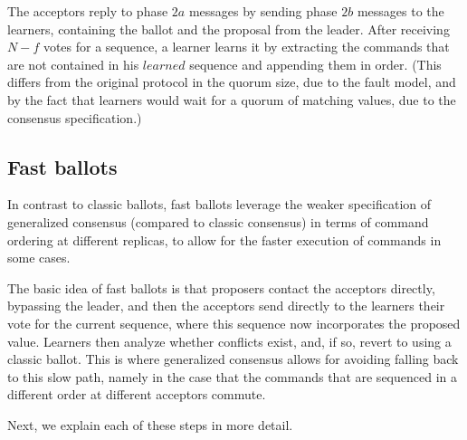 The acceptors reply to phase $2a$ messages by sending phase $2b$ messages to the learners, containing the ballot and the proposal from the leader. After receiving $N-f$ votes for a sequence, a learner learns it by extracting the commands that are not contained in his $learned$ sequence and appending them in order. (This differs from the original protocol in the quorum size, due to the fault model, and by the fact that learners would wait for a quorum of matching values, due to the consensus specification.)

\subsection{Fast ballots} 

In contrast to classic ballots, fast ballots leverage the weaker specification of generalized consensus (compared to classic consensus) in terms of command ordering at different replicas, to allow for the faster execution of commands in some cases.\par
The basic idea of fast ballots is that proposers contact the acceptors directly, bypassing the leader, and then the acceptors send directly to the learners their vote for the current sequence, where this
sequence now incorporates the proposed value. Learners then analyze whether conflicts exist, and, if so, revert to using a classic ballot. This is where generalized consensus allows for avoiding falling back to this slow path, namely in the case that the commands that are sequenced in a different order at different acceptors commute.\par
Next, we explain each of these steps in more detail.

